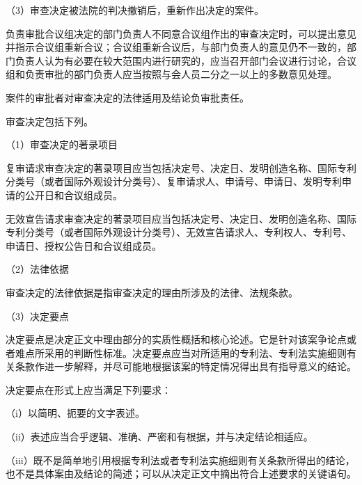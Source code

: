 {\setlength{\parindent}{17.1bp}（3）审查决定被法院的判决撤销后，重新作出决定的案件。\par}

负责审批合议组决定的部门负责人不同意合议组作出的审查决定时，可以提出意见并指示合议组重新合议；合议组重新合议后，与部门负责人的意见仍不一致的，部门负责人认为有必要在较大范围内进行研究的，应当召开部门会议进行讨论，合议组和负责审批的部门负责人应当按照与会人员二分之一以上的多数意见处理。

案件的审批者对审查决定的法律适用及结论负审批责任。

审查决定包括下列。

{\setlength{\parindent}{17.1bp}（1）审查决定的著录项目\par}

复审请求审查决定的著录项目应当包括决定号、决定日、发明创造名称、国际专利分类号（或者国际外观设计分类号）、复审请求人、申请号、申请日、发明专利申请的公开日和合议组成员。

无效宣告请求审查决定的著录项目应当包括决定号、决定日、发明创造名称、国际专利分类号（或者国际外观设计分类号）、无效宣告请求人、专利权人、专利号、申请日、授权公告日和合议组成员。

{\setlength{\parindent}{17.1bp}（2）法律依据\par}

审查决定的法律依据是指审查决定的理由所涉及的法律、法规条款。

{\setlength{\parindent}{17.1bp}（3）决定要点\par}

决定要点是决定正文中理由部分的实质性概括和核心论述。它是针对该案争论点或者难点所采用的判断性标准。决定要点应当对所适用的专利法、专利法实施细则有关条款作进一步解释，并尽可能地根据该案的特定情况得出具有指导意义的结论。

决定要点在形式上应当满足下列要求：

{\setlength{\parindent}{17.1bp}（i）以简明、扼要的文字表述。\par}

{\setlength{\parindent}{17.1bp}（ii）表述应当合乎逻辑、准确、严密和有根据，并与决定结论相适应。\par}

{\setlength{\parindent}{17.1bp}（iii）既不是简单地引用根据专利法或者专利法实施细则有关条款所得出的结论，也不是具体案由及结论的简述；可以从决定正文中摘出符合上述要求的关键语句。\par}

